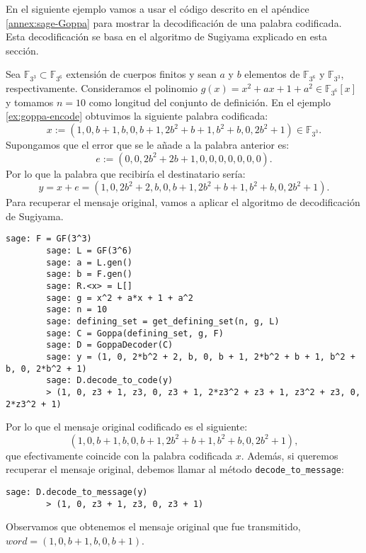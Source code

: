 En el siguiente ejemplo vamos a usar el código descrito en el apéndice \ref{annex:sage-Goppa} para mostrar la decodificación de una palabra codificada. Esta decodificación se basa en el algoritmo de Sugiyama explicado en esta sección.

\begin{exampleth}
    Sea $\mathbb{F}_{3^3} \subset \mathbb{F}_{3^6}$ extensión de cuerpos finitos y sean $a$ y $b$ elementos de $\mathbb{F}_{3^6}$ y $\mathbb{F}_{3^3}$, respectivamente. Consideramos el polinomio $g(x) = x^2 + ax + 1 + a^2 \in \mathbb{F}_{3^6}[x]$ y tomamos $n = 10$ como longitud del conjunto de definición. En el ejemplo \ref{ex:goppa-encode} obtuvimos la siguiente palabra codificada:
    \[
        x := (1, 0, b + 1, b, 0, b + 1, 2b^2 + b + 1, b^2 + b, 0, 2b^2 + 1) \in \mathbb{F}_{3^3}.
    \]
    Supongamos que el error que se le añade a la palabra anterior es:
    \[
        e := (0, 0, 2b^2 + 2b + 1, 0, 0, 0, 0, 0, 0, 0).
    \]
    Por lo que la palabra que recibiría el destinatario sería:
    \[
        y = x + e = (1, 0, 2b^2 + 2, b, 0, b + 1, 2b^2 + b + 1, b^2 + b, 0, 2b^2 + 1).
    \]
    Para recuperar el mensaje original, vamos a aplicar el algoritmo de decodificación de Sugiyama.

    \begin{lstlisting}[gobble=4]
        sage: F = GF(3^3)
        sage: L = GF(3^6)
        sage: a = L.gen()
        sage: b = F.gen()
        sage: R.<x> = L[]
        sage: g = x^2 + a*x + 1 + a^2
        sage: n = 10
        sage: defining_set = get_defining_set(n, g, L)
        sage: C = Goppa(defining_set, g, F)
        sage: D = GoppaDecoder(C)
        sage: y = (1, 0, 2*b^2 + 2, b, 0, b + 1, 2*b^2 + b + 1, b^2 + b, 0, 2*b^2 + 1)
        sage: D.decode_to_code(y)
        > (1, 0, z3 + 1, z3, 0, z3 + 1, 2*z3^2 + z3 + 1, z3^2 + z3, 0, 2*z3^2 + 1)
    \end{lstlisting}

    Por lo que el mensaje original codificado es el siguiente:
    \[
        (1, 0, b + 1, b, 0, b + 1, 2b^2 + b + 1, b^2 + b, 0, 2b^2 + 1),
    \]
    que efectivamente coincide con la palabra codificada $x$. Además, si queremos recuperar el mensaje original, debemos llamar al método \texttt{decode\_to\_message}:

    \begin{lstlisting}[gobble=4]
        sage: D.decode_to_message(y)
        > (1, 0, z3 + 1, z3, 0, z3 + 1)
    \end{lstlisting}

    Observamos que obtenemos el mensaje original que fue transmitido, $word = (1, 0, b + 1, b, 0, b + 1)$.
\end{exampleth}
